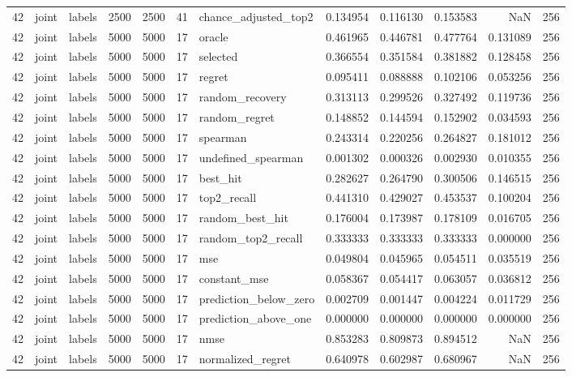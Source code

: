 \begin{tabular}{rllrrrlrrrrr}
42 & joint & labels & 2500 & 2500 & 41 & chance_adjusted_top2 & 0.134954 & 0.116130 & 0.153583 & NaN & 256 \\
42 & joint & labels & 5000 & 5000 & 17 & oracle & 0.461965 & 0.446781 & 0.477764 & 0.131089 & 256 \\
42 & joint & labels & 5000 & 5000 & 17 & selected & 0.366554 & 0.351584 & 0.381882 & 0.128458 & 256 \\
42 & joint & labels & 5000 & 5000 & 17 & regret & 0.095411 & 0.088888 & 0.102106 & 0.053256 & 256 \\
42 & joint & labels & 5000 & 5000 & 17 & random_recovery & 0.313113 & 0.299526 & 0.327492 & 0.119736 & 256 \\
42 & joint & labels & 5000 & 5000 & 17 & random_regret & 0.148852 & 0.144594 & 0.152902 & 0.034593 & 256 \\
42 & joint & labels & 5000 & 5000 & 17 & spearman & 0.243314 & 0.220256 & 0.264827 & 0.181012 & 256 \\
42 & joint & labels & 5000 & 5000 & 17 & undefined_spearman & 0.001302 & 0.000326 & 0.002930 & 0.010355 & 256 \\
42 & joint & labels & 5000 & 5000 & 17 & best_hit & 0.282627 & 0.264790 & 0.300506 & 0.146515 & 256 \\
42 & joint & labels & 5000 & 5000 & 17 & top2_recall & 0.441310 & 0.429027 & 0.453537 & 0.100204 & 256 \\
42 & joint & labels & 5000 & 5000 & 17 & random_best_hit & 0.176004 & 0.173987 & 0.178109 & 0.016705 & 256 \\
42 & joint & labels & 5000 & 5000 & 17 & random_top2_recall & 0.333333 & 0.333333 & 0.333333 & 0.000000 & 256 \\
42 & joint & labels & 5000 & 5000 & 17 & mse & 0.049804 & 0.045965 & 0.054511 & 0.035519 & 256 \\
42 & joint & labels & 5000 & 5000 & 17 & constant_mse & 0.058367 & 0.054417 & 0.063057 & 0.036812 & 256 \\
42 & joint & labels & 5000 & 5000 & 17 & prediction_below_zero & 0.002709 & 0.001447 & 0.004224 & 0.011729 & 256 \\
42 & joint & labels & 5000 & 5000 & 17 & prediction_above_one & 0.000000 & 0.000000 & 0.000000 & 0.000000 & 256 \\
42 & joint & labels & 5000 & 5000 & 17 & nmse & 0.853283 & 0.809873 & 0.894512 & NaN & 256 \\
42 & joint & labels & 5000 & 5000 & 17 & normalized_regret & 0.640978 & 0.602987 & 0.680967 & NaN & 256 \\

\end{tabular}
